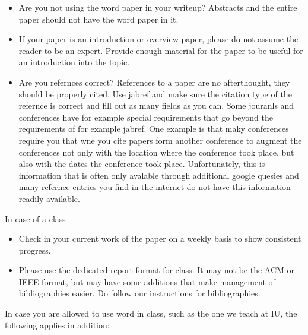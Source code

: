 \begin{itemize}[label=$\Box$]
\item Are you not using the word paper in your writeup?  Abstracts and
  the entire paper should not have the word paper in it.

\item If your paper is an introduction or overview paper, please do
  not assume the reader to be an expert. Provide enough material for
  the paper to be useful for an introduction into the topic. 

\item Are you refernces correct? References to a paper are no
  afterthought, they should be properly cited. Use jabref and make
  sure the citation type of the refernce is correct and fill out as
  many fields as you can. Some jouranls and conferences have for
  example special requirements that go beyond the requirements of for
  example jabref. One example is that maky conferences require you
  that wne you cite papers form another conference to augment the
  conferences not only with the location where the conference took
  place, but also with the dates the conference took
  place. Unfortunately, this is information that is often only
  avalable through additional google quesies and many refernce entries
  you find in the internet do not have this information readily
  available.

\end{itemize}

In case of a class

\begin{itemize}[label=$\Box$] 

\item Check in your current work of the paper on a weekly basis to
  show consistent progress.

\item Please use the dedicated report format for class. It may not be
  the ACM or IEEE format, but may have some additions that make
  management of bibliographies easier. Do follow our instructions for
  bibliographies.

\end{itemize}

In case you are allowed to use word in class, such as the one we teach
at IU, the following applies in addition:

